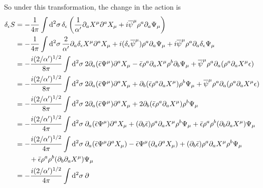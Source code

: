 \begin{tcolorbox}[breakable]
	So under this transformation, the change in the action is 
	\begin{align*}
		\delta _{\epsilon }S &=-\frac{1}{4\pi }\int \dif^{2}\sigma\, \delta _{\epsilon
		}\left( \frac{1}{\alpha ^{\prime }}\partial _{a}X^{\mu }\partial ^{a}X_{\mu
		}+\mi\overline{\psi}^{\mu }\rho ^{a}\partial _{a}\Psi _{\mu }\right)  \\
		&=-\frac{1}{4\pi }\int \dif^{2}\sigma\, \frac{2}{\alpha ^{\prime }}\partial
		_{a}\delta _{\epsilon }X^{\mu }\partial ^{a}X_{\mu }+\mi(\delta _{\epsilon }%
		\overline{\psi}^{\mu })\rho ^{a}\partial _{a}\Psi _{\mu }+\mi\overline{\psi}^{\mu }\rho
		^{a}\partial _{a}\delta _{\epsilon }\Psi _{\mu } \\
		&=-\frac{\mi(2/\alpha ^{\prime })^{1/2}}{8\pi }\int \dif^{2}\sigma\: 2\partial
		_{a}(\bar{\epsilon}\Psi ^{\mu }) \partial ^{a}X_{\mu }-\bar{%
			\epsilon}\rho ^{a}\partial _{a}X^{\mu }\rho ^{b}\partial _{b}\Psi _{\mu }+%
		\overline{\psi}^{\mu }\rho ^{a}\partial _{a}( \rho ^{a}\partial _{a}X^{\mu
		}\epsilon)  \\
		&=-\frac{\mi(2/\alpha ^{\prime })^{1/2}}{8\pi }\int \dif^{2}\sigma\: 2\partial
		_{a}( \bar{\epsilon}\Psi ^{\mu }) \partial ^{a}X_{\mu }+\partial
		_{b}( \bar{\epsilon}\rho ^{a}\partial _{a}X^{\mu }) \rho ^{b}\Psi
		_{\mu }+\overline{\psi}^{\mu }\rho ^{a}\partial _{a}( \rho ^{a}\partial
		_{a}X^{\mu }\epsilon )  \\
		&=-\frac{\mi(2/\alpha ^{\prime })^{1/2}}{8\pi }\int \dif^{2}\sigma \:2\partial
		_{a}(\bar{\epsilon}\Psi ^{\mu }) \partial ^{a}X_{\mu }+2\partial
		_{b}(\bar{\epsilon}\rho ^{a}\partial _{a}X^{\mu }) \rho ^{b}\Psi
		_{\mu } \\
		&=-\frac{\mi(2/\alpha ^{\prime })^{1/2}}{4\pi }\int \dif^{2}\sigma\: \partial
		_{a}(\bar{\epsilon}\Psi ^{\mu }) \partial ^{a}X_{\mu }+(
		\partial _{b}\bar{\epsilon}) \rho ^{a}\partial _{a}X^{\mu }\rho
		^{b}\Psi _{\mu }+\bar{\epsilon}\rho ^{a}\rho ^{b}(\partial
		_{b}\partial _{a}X^{\mu }) \Psi _{\mu } \\
		&=-\frac{\mi(2/\alpha ^{\prime })^{1/2}}{4\pi }\int \dif^{2}\sigma\: \partial
		_{a}( \bar{\epsilon}\Psi ^{\mu }\partial ^{a}X_{\mu }) -\bar{%
			\epsilon}\Psi ^{\mu }( \partial _{a}\partial ^{a}X_{\mu })
		+( \partial _{b}\bar{\epsilon}) \rho ^{a}\partial _{a}X^{\mu
		}\rho ^{b}\Psi _{\mu }\\
		&\qquad+\bar{\epsilon}\rho ^{a}\rho ^{b}( \partial
		_{b}\partial _{a}X^{\mu }) \Psi _{\mu } \\
		&=-\frac{\mi(2/\alpha ^{\prime })^{1/2}}{4\pi }\int \dif^{2}\sigma\: \partial

\end{align*}
\end{tcolorbox}
